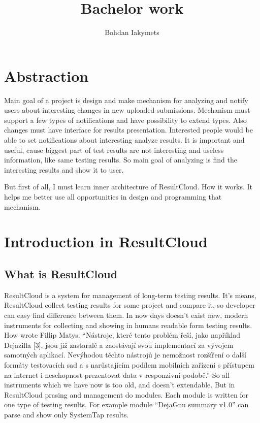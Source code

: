 \documentclass[a4paper,11pt]{article}
\title{Bachelor work \\[1mm]}
\author{Bohdan Iakymets \\ \email{xiakym00@stud.fit.vutbr.cz}}
\date{}
\begin{document}
\maketitle
\section{Abstraction}

Main goal of a project is design and make mechanism for analyzing and notify users about interesting changes in new uploaded submissions. Mechanism must support a few types of notifications and have possibility to extend types. Also changes must have interface for results presentation. Interested people would be able to set notifications about interesting analyze results.
It is important and useful, cause biggest part of test results are not interesting and useless information, like same testing results. So main goal of analyzing is find the interesting results and show it to user.

But first of all, I must learn inner architecture of ResultCloud. How it works. It helps me better use all opportunities in design and programming that mechanism.

\section{Introduction in ResultCloud}
\subsection{What is ResultCloud}

ResultCloud is a system for management of long-term testing results. It's means, ResultCloud collect testing results for some project and compare it, so developer can easy find difference between them. In now days doesn't exist new, modern instruments for collecting and showing in humans readable form testing results. How wrote Fillip Matys: “Nástroje, které tento problém řeší, jako například Dejazilla [3], jsou již zastaralé a zaostávají svou implementací za vývojem samotných aplikací. Nevýhodou těchto nástrojů je nemožnost rozšíření o další formáty testovacích sad a s narůstajícím podílem mobilních zařízení s přístupem na internet i neschopnost prezentovat data v responzivní podobě.” So all instruments which we have now is too old, and doesn't extendable. But in ResultCloud prasing and management do modules. Each module is written for one type of testing results. For example module “DejaGnu summary v1.0” can parse and show only SystemTap results. 
\end{document}

